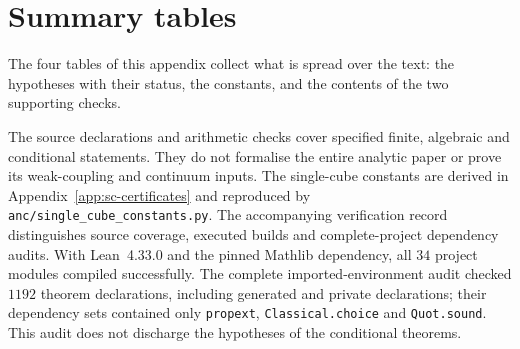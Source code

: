 \section{Summary tables}
\label{app:tables}

The four tables of this appendix collect what is spread over the text: the
hypotheses with their status, the constants, and the contents of the two
supporting checks.

The source declarations and arithmetic checks cover specified finite,
algebraic and conditional statements. They do not formalise the entire
analytic paper or prove its weak-coupling and continuum inputs.
The single-cube constants are derived in Appendix~\ref{app:sc-certificates}
and reproduced by \texttt{anc/single\_cube\_constants.py}. The accompanying
verification record distinguishes source coverage, executed builds and
complete-project dependency audits.
With Lean~4.33.0 and the pinned Mathlib dependency, all $34$ project modules
compiled successfully. The complete imported-environment audit checked
$1192$ theorem declarations, including generated and private declarations;
their dependency sets contained only \texttt{propext},
\texttt{Classical.choice} and \texttt{Quot.sound}. This audit does not
discharge the hypotheses of the conditional theorems.

